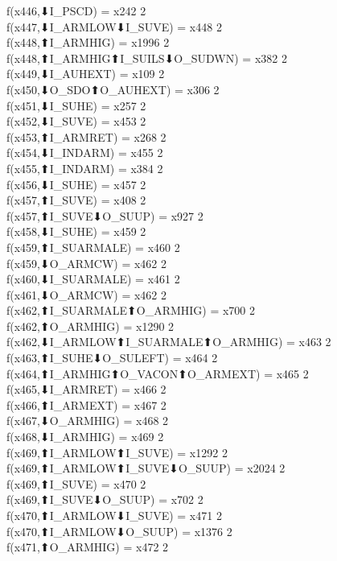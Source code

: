 f(x446,⬇I_PSCD) = x242 {2} \\
f(x447,⬇I_ARMLOW⬇I_SUVE) = x448 {2} \\
f(x448,⬆I_ARMHIG) = x1996 {2} \\
f(x448,⬆I_ARMHIG⬆I_SUILS⬇O_SUDWN) = x382 {2} \\
f(x449,⬇I_AUHEXT) = x109 {2} \\
f(x450,⬇O_SDO⬆O_AUHEXT) = x306 {2} \\
f(x451,⬇I_SUHE) = x257 {2} \\
f(x452,⬇I_SUVE) = x453 {2} \\
f(x453,⬆I_ARMRET) = x268 {2} \\
f(x454,⬇I_INDARM) = x455 {2} \\
f(x455,⬆I_INDARM) = x384 {2} \\
f(x456,⬇I_SUHE) = x457 {2} \\
f(x457,⬆I_SUVE) = x408 {2} \\
f(x457,⬆I_SUVE⬇O_SUUP) = x927 {2} \\
f(x458,⬇I_SUHE) = x459 {2} \\
f(x459,⬆I_SUARMALE) = x460 {2} \\
f(x459,⬇O_ARMCW) = x462 {2} \\
f(x460,⬇I_SUARMALE) = x461 {2} \\
f(x461,⬇O_ARMCW) = x462 {2} \\
f(x462,⬆I_SUARMALE⬆O_ARMHIG) = x700 {2} \\
f(x462,⬆O_ARMHIG) = x1290 {2} \\
f(x462,⬇I_ARMLOW⬆I_SUARMALE⬆O_ARMHIG) = x463 {2} \\
f(x463,⬆I_SUHE⬇O_SULEFT) = x464 {2} \\
f(x464,⬆I_ARMHIG⬆O_VACON⬆O_ARMEXT) = x465 {2} \\
f(x465,⬇I_ARMRET) = x466 {2} \\
f(x466,⬆I_ARMEXT) = x467 {2} \\
f(x467,⬇O_ARMHIG) = x468 {2} \\
f(x468,⬇I_ARMHIG) = x469 {2} \\
f(x469,⬆I_ARMLOW⬆I_SUVE) = x1292 {2} \\
f(x469,⬆I_ARMLOW⬆I_SUVE⬇O_SUUP) = x2024 {2} \\
f(x469,⬆I_SUVE) = x470 {2} \\
f(x469,⬆I_SUVE⬇O_SUUP) = x702 {2} \\
f(x470,⬆I_ARMLOW⬇I_SUVE) = x471 {2} \\
f(x470,⬆I_ARMLOW⬇O_SUUP) = x1376 {2} \\
f(x471,⬆O_ARMHIG) = x472 {2} \\
